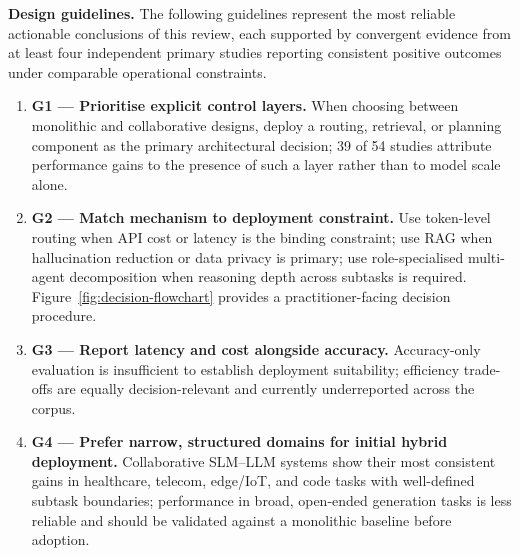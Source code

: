 \textbf{Design guidelines.} The following guidelines represent the most reliable actionable conclusions of this review, each supported by convergent evidence from at least four independent primary studies reporting consistent positive outcomes under comparable operational constraints.

\begin{enumerate}
    \item \textbf{G1 --- Prioritise explicit control layers.} When choosing between monolithic and collaborative designs, deploy a routing, retrieval, or planning component as the primary architectural decision; 39 of 54 studies attribute performance gains to the presence of such a layer rather than to model scale alone.
    \item \textbf{G2 --- Match mechanism to deployment constraint.} Use token-level routing when API cost or latency is the binding constraint; use RAG when hallucination reduction or data privacy is primary; use role-specialised multi-agent decomposition when reasoning depth across subtasks is required. Figure~\ref{fig:decision-flowchart} provides a practitioner-facing decision procedure.
    \item \textbf{G3 --- Report latency and cost alongside accuracy.} Accuracy-only evaluation is insufficient to establish deployment suitability; efficiency trade-offs are equally decision-relevant and currently underreported across the corpus.
    \item \textbf{G4 --- Prefer narrow, structured domains for initial hybrid deployment.} Collaborative SLM--LLM systems show their most consistent gains in healthcare, telecom, edge/IoT, and code tasks with well-defined subtask boundaries; performance in broad, open-ended generation tasks is less reliable and should be validated against a monolithic baseline before adoption.
\end{enumerate}

